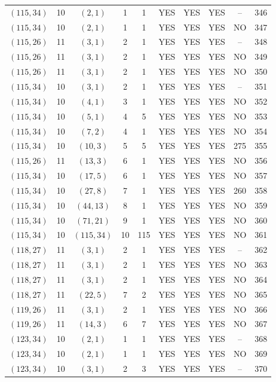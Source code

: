 \begin{longtable}{|c|c|c|c|c|c|c|c|c|c|}
$(115, 34)$ & 10 & $(2, 1)$ & 1 & 1 & YES & YES & YES & -- & 346\\
$(115, 34)$ & 10 & $(2, 1)$ & 1 & 1 & YES & YES & YES & NO & 347\\
$(115, 26)$ & 11 & $(3, 1)$ & 2 & 1 & YES & YES & YES & -- & 348\\
$(115, 26)$ & 11 & $(3, 1)$ & 2 & 1 & YES & YES & YES & NO & 349\\
$(115, 26)$ & 11 & $(3, 1)$ & 2 & 1 & YES & YES & YES & NO & 350\\
$(115, 34)$ & 10 & $(3, 1)$ & 2 & 1 & YES & YES & YES & -- & 351\\
$(115, 34)$ & 10 & $(4, 1)$ & 3 & 1 & YES & YES & YES & NO & 352\\
$(115, 34)$ & 10 & $(5, 1)$ & 4 & 5 & YES & YES & YES & NO & 353\\
$(115, 34)$ & 10 & $(7, 2)$ & 4 & 1 & YES & YES & YES & NO & 354\\
$(115, 34)$ & 10 & $(10, 3)$ & 5 & 5 & YES & YES & YES & 275 & 355\\
$(115, 26)$ & 11 & $(13, 3)$ & 6 & 1 & YES & YES & YES & NO & 356\\
$(115, 34)$ & 10 & $(17, 5)$ & 6 & 1 & YES & YES & YES & NO & 357\\
$(115, 34)$ & 10 & $(27, 8)$ & 7 & 1 & YES & YES & YES & 260 & 358\\
$(115, 34)$ & 10 & $(44, 13)$ & 8 & 1 & YES & YES & YES & NO & 359\\
$(115, 34)$ & 10 & $(71, 21)$ & 9 & 1 & YES & YES & YES & NO & 360\\
$(115, 34)$ & 10 & $(115, 34)$ & 10 & 115 & YES & YES & YES & NO & 361\\
$(118, 27)$ & 11 & $(3, 1)$ & 2 & 1 & YES & YES & YES & -- & 362\\
$(118, 27)$ & 11 & $(3, 1)$ & 2 & 1 & YES & YES & YES & NO & 363\\
$(118, 27)$ & 11 & $(3, 1)$ & 2 & 1 & YES & YES & YES & NO & 364\\
$(118, 27)$ & 11 & $(22, 5)$ & 7 & 2 & YES & YES & YES & NO & 365\\
$(119, 26)$ & 11 & $(3, 1)$ & 2 & 1 & YES & YES & YES & NO & 366\\
$(119, 26)$ & 11 & $(14, 3)$ & 6 & 7 & YES & YES & YES & NO & 367\\
$(123, 34)$ & 10 & $(2, 1)$ & 1 & 1 & YES & YES & YES & -- & 368\\
$(123, 34)$ & 10 & $(2, 1)$ & 1 & 1 & YES & YES & YES & NO & 369\\
$(123, 34)$ & 10 & $(3, 1)$ & 2 & 3 & YES & YES & YES & -- & 370\\

\end{longtable}
